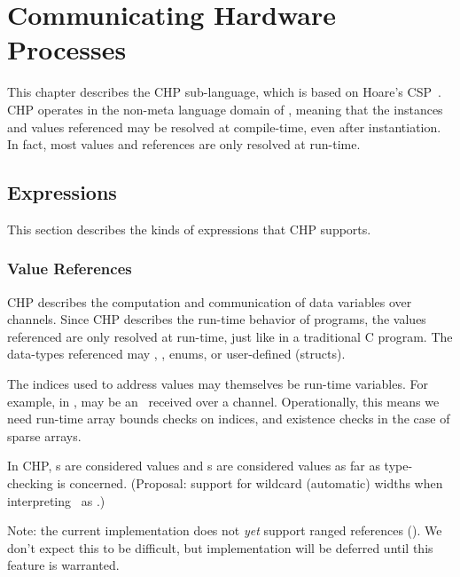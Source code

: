 

\chapter{Communicating Hardware Processes}
\label{sec:chp}

This chapter describes the CHP sub-language, which is based on
Hoare's CSP~\cite{ref:csp}.  
CHP operates in the non-meta language domain of \hac, 
meaning that the instances and values referenced may be
resolved at compile-time, even after instantiation.  
In fact, most values and references are only resolved at run-time.  


\section{Expressions}
\label{sec:chp:expr}

This section describes the kinds of expressions that CHP supports.  

\subsection{Value References}
\label{sec:chp:expr:values}

CHP describes the computation and communication of data variables
over channels.  
Since CHP describes the run-time behavior of programs, 
the values referenced are only resolved at run-time, 
just like in a traditional C program.  
The data-types referenced may \bool, \int, enums, or user-defined (structs).  

The indices used to address values may themselves be run-time variables.  
For example, in ,  may be an \int\ received over a channel.  
Operationally, this means we need run-time array bounds checks on indices, 
and existence checks in the case of sparse arrays.  

In CHP, \pint s are considered \int{} values and
\pbool s are considered \bool values as far as type-checking is concerned.  
(Proposal: support for wildcard (automatic) widths when interpreting
\pint\ as \int.)  

Note: the current implementation does not \emph{yet} support ranged
references (). 
We don't expect this to be difficult, but implementation will be deferred
until this feature is warranted.  

